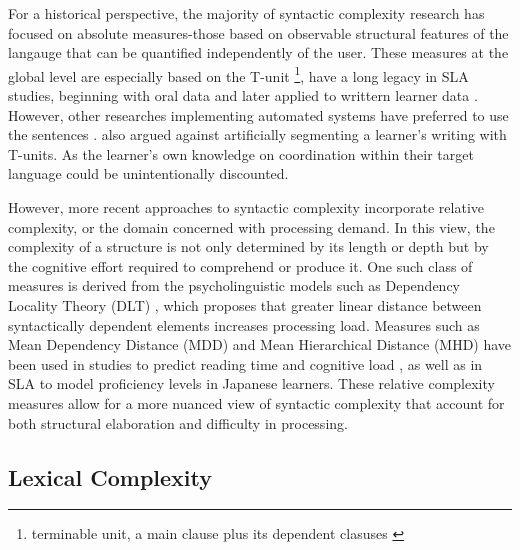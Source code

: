 For a historical perspective, the majority of syntactic complexity research has focused on absolute measures-those 
based on observable structural features of the langauge that can be quantified independently of the user. These 
measures at the global level are especially based on the T-unit
\footnote{terminable unit, a main clause plus its dependent clasuses
\cite{hunt1965}}, have a long legacy in SLA studies, beginning with oral data \cite{hunt1965} and later applied to
writtern learner data \cite{Ortega2003,Lu2011}. However, other researches implementing automated systems have
preferred to use the sentences \cite{Vyatkina2012,Lu2010}. \citet{Bardovi-Harlig1992} also argued against
artificially segmenting a learner's writing with T-units. As the learner's own knowledge on coordination within
their target language could be unintentionally discounted.

However, more recent approaches to syntactic complexity incorporate relative complexity, or the domain concerned
with processing demand. In this view, the complexity of a structure is not only determined by its length or depth
but by the cognitive effort required to comprehend or produce it. One such class of measures is derived from the 
psycholinguistic models such as Dependency Locality Theory (DLT) \cite{Gibson2000}, which proposes that greater linear distance 
between syntactically dependent elements increases processing load. Measures such as Mean Dependency Distance (MDD)\cite{Liu2008} and Mean Hierarchical Distance (MHD) \cite{Liu2017} have been used in studies to predict reading time and cognitive load \cite{shain2016, Feng2009}, as well as in SLA to model proficiency levels in Japanese learners\cite{Jiang2019,komori2019,Yang2023}. These relative complexity measures allow for a more nuanced view of syntactic complexity that account for both structural elaboration and difficulty in processing. %


\subsection{Lexical Complexity}

